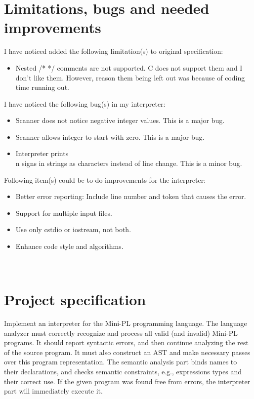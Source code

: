 \documentclass[english,11pt,twoside,a4paper]{article}
\begin{document}
\section{Limitations, bugs and needed improvements}

I have noticed added the following limitation(s) to original specification:
\begin{itemize}
	\item Nested /* */ comments are not supported. C does not support them and I don't like them. However, reason them being left out was because of coding time running out.
\end{itemize}

I have noticed the following bug(s) in my interpreter:
\begin{itemize}
	\item Scanner does not notice negative integer values. This is a major bug.
	\item Scanner allows integer to start with zero. This is a major bug.
	\item Interpreter prints \\n signs in strings as characters instead of line change. This is a minor bug.
\end{itemize}

Following item(s) could be to-do improvements for the interpreter:
\begin{itemize}
	\item Better error reporting: Include line number and token that causes the error.
	\item Support for multiple input files.
	\item Use only cstdio or iostream, not both.
	\item Enhance code style and algorithms.
\end{itemize}

\newpage
\appendix
\section{\\Project specification} \label{App:ProjectSpec}

Implement an interpreter for the Mini-PL programming language. The language analyzer must correctly recognize and process all valid (and invalid) Mini-PL programs. It should report syntactic errors, and then continue analyzing the rest of the source program. It must also construct an AST and make necessary passes over this program representation. The semantic analysis part binds names to their declarations, and checks semantic constraints, e.g., expressions types and their correct use. If the given program was found free from errors, the interpreter part will immediately execute it.
\end{document}
